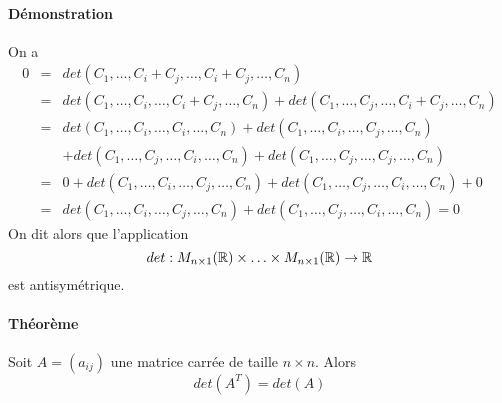 \paragraph{Démonstration} On a
\begin{eqnarray*}
  0 &=& det(C_1, \ldots, C_i+C_j, \ldots, C_i+C_j, \ldots, C_n) \\
    &=& det(C_1, \ldots, C_i, \ldots, C_i+C_j, \ldots, C_n) + det(C_1, \ldots, C_j, \ldots, C_i+C_j, \ldots, C_n) \\
    &=& det(C_1, \ldots, C_i, \ldots, C_i, \ldots, C_n) + det(C_1, \ldots, C_i, \ldots, C_j, \ldots, C_n) \\
      &&+ det(C_1, \ldots, C_j, \ldots, C_i, \ldots, C_n) + det(C_1, \ldots, C_j, \ldots, C_j, \ldots, C_n) \\
    &=& 0 + det(C_1, \ldots, C_i, \ldots, C_j, \ldots, C_n) + det(C_1, \ldots, C_j, \ldots, C_i, \ldots, C_n) + 0 \\
    &=& det(C_1, \ldots, C_i, \ldots, C_j, \ldots, C_n) + det(C_1, \ldots, C_j, \ldots, C_i, \ldots, C_n) = 0
\end{eqnarray*}
On dit alors que l'application 
$$det: M_{n \times 1}(\mathbb{R}) \times \ldots \times M_{n\times 1}(\mathbb{R}) \rightarrow \mathbb{R}$$
est antisymétrique.

\paragraph{Théorème} Soit $A =(a_{ij})$ une matrice carrée de taille $n\times n$. Alors
$$det(A^{T}) = det(A)$$

